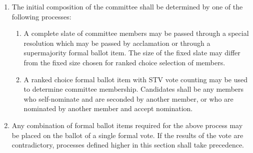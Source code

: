 \documentclass[11pt]{article}
\newcounter{h1}
\newcounter{h2}[h1]
\newcounter{h3}[h2]
\begin{document}
\begin{enumerate}
\begin{enumerate}
\begin{enumerate}
    \end{enumerate}
    \item Optionally, a clause delaying the formation of the committee. Such a clause must specify (i) a finite delay period, (ii) a specific date on which the committee shall be created, or (iii) a specific event or occurrence after which the committee shall be created.  
    \begin{enumerate}
      \item Unless the creation of the committee is tied to the expiry of another committee, if a committee's creation is delayed by further than 42 days, it shall no longer be created.  
      \item Time which passes during the delay period shall not count toward limits on the lifespan of a committee.  
    \end{enumerate}
  \end{enumerate}
  \item The initial composition of the committee shall be determined by one of the following processes:  
  \begin{enumerate}
    \item A complete slate of committee members may be passed through a special resolution which may be passed by acclamation or through a supermajority formal ballot item. The size of the fixed slate may differ from the fixed size chosen for ranked choice selection of members.  
    \item A ranked choice formal ballot item with STV vote counting may be used to determine committee membership. Candidates shall be any members who self-nominate and are seconded by another member, or who are nominated by another member and accept nomination.  
  \end{enumerate}
  \item Any combination of formal ballot items required for the above process may be placed on the ballot of a single formal vote. If the results of the vote are contradictory, processes defined higher in this section shall take precedence.
\end{enumerate}

\end{document}
